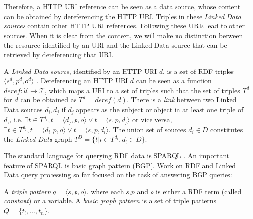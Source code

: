 Therefore, a HTTP URI reference can be seen as a data source, whose
content can be obtained by dereferencing the HTTP URI. Triples in
these \emph{Linked Data sources} contain other HTTP URI
references. Following these URIs lead to other sources. When it is
clear from the context, we will make no distinction between the
resource identified by an URI and the Linked Data source that can be
retrieved by dereferencing that URI.

\begin{definition}
  A \emph{Linked Data source}, identified by an HTTP URI $d$, is a set of RDF triples $\langle s^d,p^d,o^d \rangle$ . Dereferencing an
  HTTP URI $d$ can be seen as a function $deref : \mathcal{U} \rightarrow \mathcal{T}$, which maps a URI to a set of triples such that the set of triples $T^d$ for $d$ can be obtained as $T^d = \mathit{deref}(d)$. There is a \emph{link} between two Linked Data
  sources $d_i, d_j$ if $d_j$ appears as the subject or object in at
  least one triple of $d_i$, i.e. $\exists t\in T^{d_i},t=\langle d_j,p,o \rangle \vee t=\langle s,p,d_j \rangle$ or vice versa, $\exists t\in T^{d_j},t=\langle d_i,p,o \rangle \vee t=\langle s,p,d_i \rangle$. The union set of
  sources $d_i \in D$ constitutes the \emph{Linked Data} graph
  $T^D=\{t| t \in T^{d_i}, d_i \in D\}$.

\end{definition}

The standard language for querying RDF data is SPARQL
\cite{prudhommeaux_sparql_2008}. An important feature of SPARQL 
is basic graph pattern (BGP). Work on RDF and Linked Data query processing
so far focused on the task of answering BGP queries: 

\begin{definition}
  A \emph{triple pattern} $q=\langle s,p,o \rangle$, where each $s$,$p$ and $o$ is either a RDF term (called \emph{constant}) or a variable. A \emph{basic graph pattern} is a set of triple patterns $Q= \{t_i,\ldots,t_n\}$. 
\end{definition}


